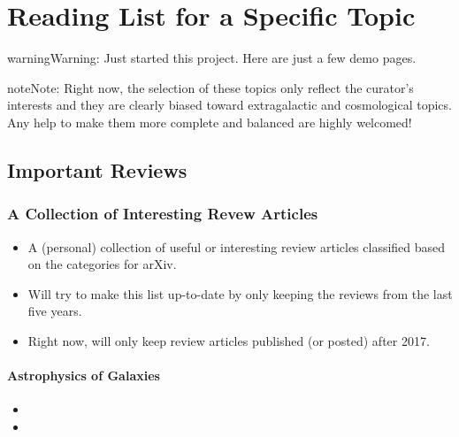 \documentclass[letterpaper,10pt,english]{sphinxmanual}
\begin{document}
\section{Reading List for a Specific Topic}
\label{\detokenize{astro_reading:reading-list-for-a-specific-topic}}\label{\detokenize{astro_reading::doc}}
\begin{sphinxadmonition}{warning}{Warning:}
Just started this project. Here are just a few demo pages.
\end{sphinxadmonition}

\begin{sphinxadmonition}{note}{Note:}
Right now, the selection of these topics only reflect the curator’s interests and they are
clearly biased toward extragalactic and cosmological topics.
Any help to make them more complete and balanced are highly welcomed!
\end{sphinxadmonition}


\subsection{Important Reviews}
\label{\detokenize{astro_reading:important-reviews}}

\subsubsection{A Collection of Interesting Revew Articles}
\label{\detokenize{resource/astro/reference/reviews:a-collection-of-interesting-revew-articles}}\label{\detokenize{resource/astro/reference/reviews::doc}}
\begin{itemize}
\item {} 
A (personal) collection of useful or interesting review articles
classified based on the  categories for arXiv.

\item {} 
Will try to make this list up-to-date by only keeping the reviews
from the last five years.

\item {} 
Right now, will only keep review articles published (or posted) after
2017.

\end{itemize}


\paragraph{Astrophysics of Galaxies}
\label{\detokenize{resource/astro/reference/reviews:astrophysics-of-galaxies}}\begin{itemize}
\item {} 

\item {} 

\end{itemize}
\end{document}
